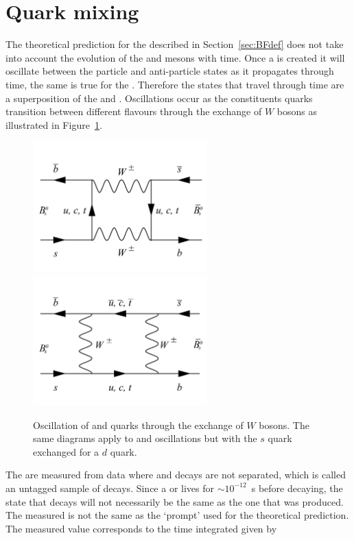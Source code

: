 {\section{Quark mixing}
\label{sec:quarkmaixing}
The theoretical prediction for the \bmumu \BFs described in Section~\ref{sec:BFdef} does not take into account the evolution of the \bsd and \barbsd mesons with time. Once a \bsd is created it will oscillate between the particle and anti-particle states as it propagates through time, the same is true for the \barbsd. Therefore the states that travel through time are a superposition of the \bsd and \barbsd. Oscillations occur as the constituents quarks transition between different flavours through the exchange of $W$ bosons as illustrated in Figure~\ref{fig:Oscl_diag}.
\begin{figure}[tbp]
    \centering
        \includegraphics[width=0.6\textwidth]{./Figs/Theory/Oscillation_1.pdf}
        \includegraphics[width=0.6\textwidth]{./Figs/Theory/Oscillation_2.pdf}
    \caption{Oscillation of \bs and \barbs quarks through the exchange of $W$ bosons. The same diagrams apply to \bd and \barbd oscillations but with the $s$ quark exchanged for a $d$ quark.}
    \label{fig:Oscl_diag}
\end{figure}
The \BFs are measured from data where \bsd and \barbsd decays are not separated, which is called an untagged sample of \bmumu decays. Since a \bsd or \barbsd lives for $\sim10^{-12}$~s before decaying, the state that decays will not necessarily be the same as the one that was produced. The measured \BF is not the same as the `prompt' \BF used for the theoretical prediction. The measured value corresponds to the time integrated \BF given by~\cite{DeBruyn:2012wj}
}
